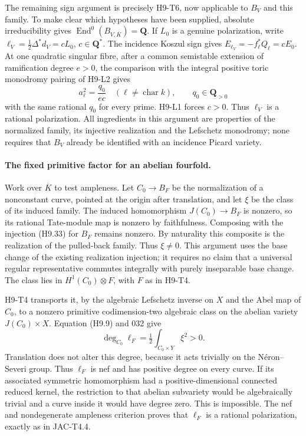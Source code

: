 \documentclass[11pt,a4paper]{article}
\begin{document}
The remaining sign argument is precisely H9-T6, now applicable to
$B_V$ and this family. To make clear which hypotheses have been
supplied, absolute irreducibility gives
$\operatorname{End}^0(B_{V,\overline K})=\mathbf Q$. If $L_0$ is a
genuine polarization, write
$\ell_V=\tfrac12\Delta^*d_V=cL_0$, $c\in\mathbf Q^*$.
The incidence Koszul sign gives
$E_{\ell_V}=-f_\ell^*Q_\ell=cE_0$. At one quadratic singular fibre,
after a common semistable extension of ramification degree $e>0$,
the comparison with the integral positive toric monodromy pairing of
H9-L2 gives
\[
 a_\ell^2=\frac{q_0}{e c}\quad(\ell\ne\operatorname{char}k),
 \qquad q_0\in\mathbf Q_{>0}
\]
with the same rational $q_0$ for every prime. H9-L1 forces $c>0$.
Thus $\ell_V$ is a rational polarization. All ingredients in this
argument are properties of the normalized family, its injective
realization and the Lefschetz monodromy; none requires that $B_V$
already be identified with an incidence Picard variety.

\paragraph{The fixed primitive factor for an abelian fourfold.}
Work over $\overline K$ to test ampleness. Let $C_0\to B_F$ be the
normalization of a nonconstant curve, pointed at the origin after
translation, and let $\xi$ be the class of its induced family.
The induced homomorphism $J(C_0)\to B_F$ is nonzero, so its rational
Tate-module map is nonzero by faithfulness. Composing with the
injection (H9.33) for $B_F$ remains nonzero. By naturality this
composite is the realization of the pulled-back family. Thus
$\xi\ne0$. This argument uses the base change of the existing
realization injection; it requires no claim that a universal regular
representative commutes integrally with purely inseparable base change.
The class lies in $H^1(C_0)\otimes F$, with $F$ as in H9-T4.

H9-T4 transports it, by the algebraic Lefschetz inverse on $X$ and the
Abel map of $C_0$, to a nonzero primitive codimension-two algebraic
class on the abelian variety $J(C_0)\times X$. Equation (H9.9) and
032 give
\[
 \deg_{C_0}\ell_F
       =\tfrac12\int_{C_0\times Y}\xi^2>0.
\]
Translation does not alter this degree, because it acts trivially on
the N\'eron--Severi group. Thus $\ell_F$ is nef and has positive degree
on every curve. If its associated symmetric homomorphism had a
positive-dimensional connected reduced kernel, the restriction to
that abelian subvariety would be algebraically trivial and a curve
inside it would have degree zero. This is impossible. The nef and
nondegenerate ampleness criterion proves that $\ell_F$ is a rational
polarization, exactly as in JAC-T4.4.
\end{document}
